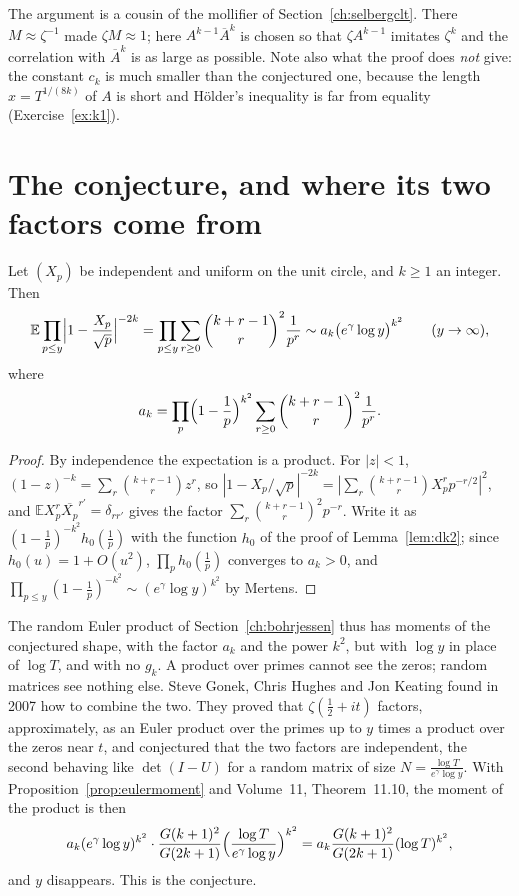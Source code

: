 The argument is a cousin of the mollifier of Section~\ref{ch:selbergclt}. There $M\approx\zeta^{-1}$ made $\zeta M\approx1$; here $A^{k-1}\overline A^k$ is chosen so that $\zeta A^{k-1}$ imitates $\zeta^k$ and the correlation with $\overline A^k$ is as large as possible. Note also what the proof does \emph{not} give: the constant $c_k$ is much smaller than the conjectured one, because the length $x=T^{1/(8k)}$ of $A$ is short and Hölder's inequality is far from equality (Exercise~\ref{ex:k1}).

\section{The conjecture, and where its two factors come from}

\begin{proposition}\label{prop:eulermoment}
Let $(X_p)$ be independent and uniform on the unit circle, and $k\ge1$ an integer. Then
\[
\mathbb E\prod_{p\le y}\Bigl|1-\frac{X_p}{\sqrt p}\Bigr|^{-2k}=\prod_{p\le y}\sum_{r\ge0}\binom{k+r-1}r^2\frac1{p^r}\sim a_k\bigl(e^\gamma\log y\bigr)^{k^2}\qquad(y\to\infty),
\]
where
\[
a_k=\prod_p\Bigl(1-\frac1p\Bigr)^{k^2}\sum_{r\ge0}\binom{k+r-1}r^2\frac1{p^r}.
\]
\end{proposition}
\begin{proof}
By independence the expectation is a product. For $|z|<1$, $(1-z)^{-k}=\sum_r\binom{k+r-1}rz^r$, so $|1-X_p/\sqrt p|^{-2k}=|\sum_r\binom{k+r-1}rX_p^rp^{-r/2}|^2$, and $\mathbb EX_p^r\overline{X_p}^{r'}=\delta_{rr'}$ gives the factor $\sum_r\binom{k+r-1}r^2p^{-r}$. Write it as $(1-\frac1p)^{-k^2}h_0(\frac1p)$ with the function $h_0$ of the proof of Lemma~\ref{lem:dk2}; since $h_0(u)=1+O(u^2)$, $\prod_ph_0(\frac1p)$ converges to $a_k>0$, and $\prod_{p\le y}(1-\frac1p)^{-k^2}\sim(e^\gamma\log y)^{k^2}$ by Mertens.
\end{proof}

The random Euler product of Section~\ref{ch:bohrjessen} thus has moments of the conjectured shape, with the factor $a_k$ and the power $k^2$, but with $\log y$ in place of $\log T$, and with no $g_k$. A product over primes cannot see the zeros; random matrices see nothing else. Steve Gonek, Chris Hughes and Jon Keating found in 2007 how to combine the two. They proved that $\zeta(\frac12+it)$ factors, approximately, as an Euler product over the primes up to $y$ times a product over the zeros near $t$, and conjectured that the two factors are independent, the second behaving like $\det(I-U)$ for a random matrix of size $N=\frac{\log T}{e^\gamma\log y}$. With Proposition~\ref{prop:eulermoment} and Volume~11, Theorem~11.10, the moment of the product is then
\[
a_k(e^\gamma\log y)^{k^2}\cdot\frac{G(k+1)^2}{G(2k+1)}\Bigl(\frac{\log T}{e^\gamma\log y}\Bigr)^{k^2}=a_k\frac{G(k+1)^2}{G(2k+1)}(\log T)^{k^2},
\]
and $y$ disappears. This is the conjecture.

